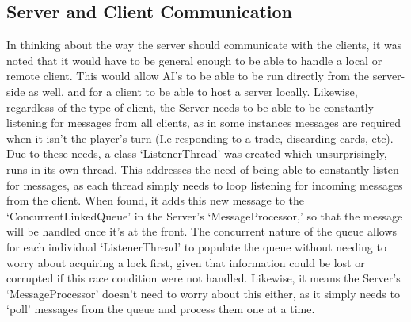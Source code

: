 \documentclass[a4paper,doc,draftfirst]{apa6}
\begin{document}
\subsection{Server and Client Communication}
In thinking about the way the server should communicate with the clients, it was noted that it would have to be general enough to be able to handle a local or remote client. This would allow AI’s to be able to be run directly from the server-side as well, and for a client to be able to host a server locally. Likewise, regardless of the type of client, the Server needs to be able to be constantly listening for messages from all clients, as in some instances messages are required when it isn’t the player’s turn (I.e responding to a trade, discarding cards, etc). Due to these needs, a class ‘ListenerThread’ was created which unsurprisingly, runs in its own thread. This addresses the need of being able to constantly listen for messages, as each thread simply needs to loop listening for incoming messages from the client. When found, it adds this new message to the ‘ConcurrentLinkedQueue’ in the Server’s ‘MessageProcessor,’ so that the message will be handled once it’s at the front. The concurrent nature of the queue allows for each individual ‘ListenerThread’ to populate the queue without needing to worry about acquiring a lock first, given that information could be lost or corrupted if this race condition were not handled. Likewise, it means the Server’s ‘MessageProcessor’ doesn’t need to worry about this either, as it simply needs to ‘poll’ messages from the queue and process them one at a time.
\end{document}
